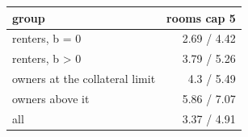 \begin{tabular}{lr}
\toprule
group & rooms cap 5 \\
\midrule
renters, b = 0 & 2.69 / 4.42 \\
renters, b > 0 & 3.79 / 5.26 \\
owners at the collateral limit & 4.3 / 5.49 \\
owners above it & 5.86 / 7.07 \\
all & 3.37 / 4.91 \\
\bottomrule
\end{tabular}
